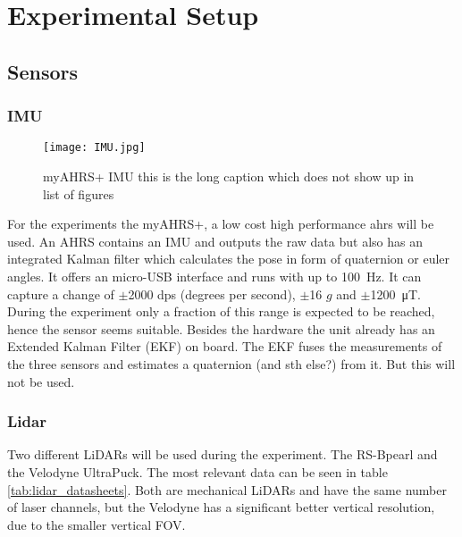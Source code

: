 \chapter{Experimental Setup}
\label{ch:ExperimentalSetup}

\section{Sensors}
\subsection{IMU}
\begin{figure}[htb]
	\centering
	\texttt{[image: IMU.jpg]}
	\caption[myAHRS+ IMU]{myAHRS+ IMU this is the long caption which does not show up in list of figures }
	\label{fig:imu}
\end{figure}

For the experiments the myAHRS+, a low cost high performance \gls{ahrs} will be used.
An AHRS contains an IMU and outputs the raw data but also has an integrated Kalman filter which calculates the pose in form of quaternion or euler angles.
It offers an micro-USB interface and runs with up to \SI{100}{\Hz}.
It can capture a change of $\pm$2000 dps (degrees per second), $\pm$16 $g$ and $\pm$\SI{1200}{\micro\tesla}.
During the experiment only a fraction of this range is expected to be reached, hence the sensor seems suitable.
Besides the hardware the unit already has an Extended Kalman Filter (EKF) on board.
The EKF fuses the measurements of the three sensors and estimates a quaternion (and sth else?) from it.
But this will not be used.

\subsection{Lidar}
Two different LiDARs will be used during the experiment.
The RS-Bpearl and the Velodyne UltraPuck.
The most relevant data can be seen in table \ref{tab:lidar_datasheets}.
Both are mechanical LiDARs and have the same number of laser channels, but the Velodyne has a significant better vertical resolution, due to the smaller vertical FOV.

